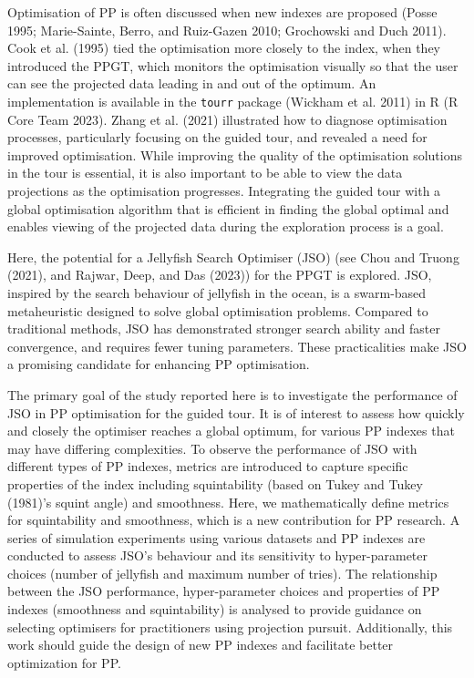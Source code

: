 \documentclass[
  12pt,
]{interact}
\theoremstyle{plain}
\begin{document}
Optimisation of PP is often discussed when new indexes are proposed
(Posse 1995; Marie-Sainte, Berro, and Ruiz-Gazen 2010; Grochowski and
Duch 2011). Cook et al. (1995) tied the optimisation more closely to the
index, when they introduced the PPGT, which monitors the optimisation
visually so that the user can see the projected data leading in and out
of the optimum. An implementation is available in the \texttt{tourr}
package (Wickham et al. 2011) in R (R Core Team 2023). Zhang et al.
(2021) illustrated how to diagnose optimisation processes, particularly
focusing on the guided tour, and revealed a need for improved
optimisation. While improving the quality of the optimisation solutions
in the tour is essential, it is also important to be able to view the
data projections as the optimisation progresses. Integrating the guided
tour with a global optimisation algorithm that is efficient in finding
the global optimal and enables viewing of the projected data during the
exploration process is a goal.

Here, the potential for a Jellyfish Search Optimiser (JSO) (see Chou and
Truong (2021), and Rajwar, Deep, and Das (2023)) for the PPGT is
explored. JSO, inspired by the search behaviour of jellyfish in the
ocean, is a swarm-based metaheuristic designed to solve global
optimisation problems. Compared to traditional methods, JSO has
demonstrated stronger search ability and faster convergence, and
requires fewer tuning parameters. These practicalities make JSO a
promising candidate for enhancing PP optimisation.

The primary goal of the study reported here is to investigate the
performance of JSO in PP optimisation for the guided tour. It is of
interest to assess how quickly and closely the optimiser reaches a
global optimum, for various PP indexes that may have differing
complexities. To observe the performance of JSO with different types of
PP indexes, metrics are introduced to capture specific properties of the
index including squintability (based on Tukey and Tukey (1981)'s squint
angle) and smoothness. Here, we mathematically define metrics for
squintability and smoothness, which is a new contribution for PP
research. A series of simulation experiments using various datasets and
PP indexes are conducted to assess JSO's behaviour and its sensitivity
to hyper-parameter choices (number of jellyfish and maximum number of
tries). The relationship between the JSO performance, hyper-parameter
choices and properties of PP indexes (smoothness and squintability) is
analysed to provide guidance on selecting optimisers for practitioners
using projection pursuit. Additionally, this work should guide the
design of new PP indexes and facilitate better optimization for PP.
\end{document}
